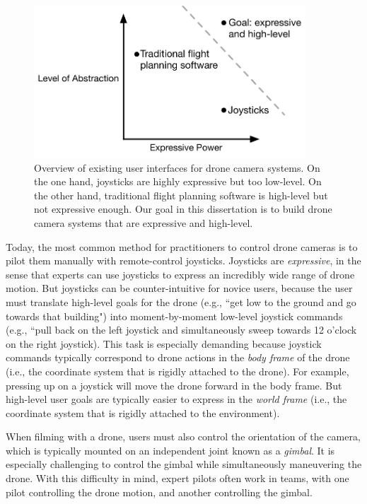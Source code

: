 \begin{figure}[th!]
\centering
\includegraphics[width=4.0in]{images/2018_introduction/intro.pdf}
\caption{
Overview of existing user interfaces for drone camera systems.
On the one hand, joysticks are highly expressive but too low-level.
On the other hand, traditional flight planning software is high-level but not expressive enough.
Our goal in this dissertation is to build drone camera systems that are expressive and high-level.
}
\label{fig:ch1:intro}
\end{figure}

Today, the most common method for practitioners to control drone cameras is to pilot them manually with remote-control joysticks.
Joysticks are \emph{expressive}, in the sense that experts can use joysticks to express an incredibly wide range of drone motion.
But joysticks can be counter-intuitive for novice users, because the user must translate high-level goals for the drone (e.g., ``get low to the ground and go towards that building") into moment-by-moment low-level joystick commands (e.g., ``pull back on the left joystick and simultaneously sweep towards 12 o'clock on the right joystick).
This task is especially demanding because joystick commands typically correspond to drone actions in the \emph{body frame} of the drone (i.e., the coordinate system that is rigidly attached to the drone). 
For example, pressing up on a joystick will move the drone forward in the body frame.
But high-level user goals are typically easier to express in the \emph{world frame} (i.e., the coordinate system that is rigidly attached to the environment).

When filming with a drone, users must also control the orientation of the camera, which is typically mounted on an independent joint known as a \emph{gimbal}.
It is especially challenging to control the gimbal while simultaneously maneuvering the drone.
With this difficulty in mind, expert pilots often work in teams, with one pilot controlling the drone motion, and another controlling the gimbal.

